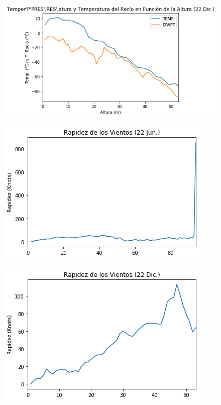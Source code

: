 \documentclass{article}
\begin{document}
    \begin{figure}[H]
        \centering
        \includegraphics[width=\linewidth]{ttrd.png}
    \end{figure}
    \begin{figure}[H]
        \centering
        \includegraphics[width=\linewidth]{vj.png}
    \end{figure}
     \begin{figure}[H]
        \centering
        \includegraphics[width=\linewidth]{vd.png}
    \end{figure}
\end{document}
